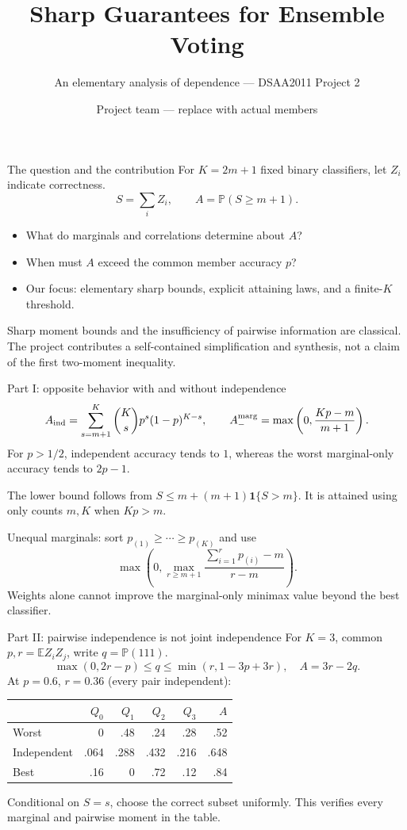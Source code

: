 \documentclass[aspectratio=169]{beamer}
\title{Sharp Guarantees for Ensemble Voting}
\subtitle{An elementary analysis of dependence --- DSAA2011 Project 2}
\author{Project team --- replace with actual members}
\date{}
\newcommand{\Ex}{\mathbb E}
\newcommand{\Prb}{\mathbb P}
\begin{document}
\begin{frame}\titlepage\end{frame}
\begin{frame}{The question and the contribution}
For $K=2m+1$ fixed binary classifiers, let $Z_i$ indicate correctness.
\[
S=\sum_iZ_i,\qquad A=\Prb(S\ge m+1).
\]
\begin{itemize}
\item What do marginals and correlations determine about $A$?
\item When must $A$ exceed the common member accuracy $p$?
\item Our focus: elementary sharp bounds, explicit attaining laws, and a finite-$K$ threshold.
\end{itemize}
\medskip
Sharp moment bounds and the insufficiency of pairwise information are classical. The project contributes a self-contained simplification and synthesis, not a claim of the first two-moment inequality.
\end{frame}
\begin{frame}{Part I: opposite behavior with and without independence}
\[
 A_{\rm ind}=\sum_{s=m+1}^K\binom Ks p^s(1-p)^{K-s},\qquad
 A_-^{\rm marg}=\max\left(0,\frac{Kp-m}{m+1}\right).
\]
For $p>1/2$, independent accuracy tends to $1$, whereas the worst marginal-only accuracy tends to $2p-1$.
\medskip

The lower bound follows from $S\le m+(m+1)\mathbf1\{S>m\}$.
It is attained using only counts $m,K$ when $Kp>m$.
\medskip

Unequal marginals: sort $p_{(1)}\ge\cdots\ge p_{(K)}$ and use
\[
\max\left(0,\max_{r\ge m+1}\frac{\sum_{i=1}^r p_{(i)}-m}{r-m}\right).
\]
Weights alone cannot improve the marginal-only minimax value beyond the best classifier.
\end{frame}
\begin{frame}{Part II: pairwise independence is not joint independence}
For $K=3$, common $p,r=\Ex Z_iZ_j$, write $q=\Prb(111)$.
\[
\max(0,2r-p)\le q\le\min(r,1-3p+3r),\quad A=3r-2q.
\]
At $p=0.6$, $r=0.36$ (every pair independent):
\begin{center}
\begin{tabular}{lrrrrr}\toprule
 & $Q_0$ & $Q_1$ & $Q_2$ & $Q_3$ & $A$\\\midrule
Worst & 0 & .48 & .24 & .28 & .52\\
Independent & .064 & .288 & .432 & .216 & .648\\
Best & .16 & 0 & .72 & .12 & .84\\\bottomrule
\end{tabular}
\end{center}
Conditional on $S=s$, choose the correct subset uniformly. This verifies every marginal and pairwise moment in the table.
\end{frame}
\end{document}
